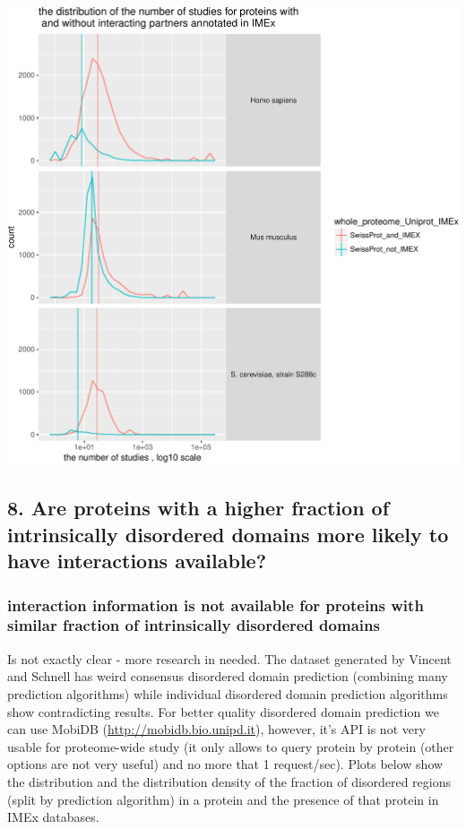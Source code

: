 \documentclass[]{article}
\begin{document}
\includegraphics{final_report_files/figure-latex/presence_in_IMEx_vs_publications-1.pdf}

\subsection{8. Are proteins with a higher fraction of intrinsically
disordered domains more likely to have interactions
available?}\label{are-proteins-with-a-higher-fraction-of-intrinsically-disordered-domains-more-likely-to-have-interactions-available}

\subsubsection{interaction information is not available for proteins
with similar fraction of intrinsically disordered
domains}\label{interaction-information-is-not-available-for-proteins-with-similar-fraction-of-intrinsically-disordered-domains}

Is not exactly clear - more research in needed. The dataset generated by
Vincent and Schnell has weird consensus disordered domain prediction
(combining many prediction algorithms) while individual disordered
domain prediction algorithms show contradicting results. For better
quality disordered domain prediction we can use MobiDB
(\url{http://mobidb.bio.unipd.it}), however, it's API is not very usable
for proteome-wide study (it only allows to query protein by protein
(other options are not very useful) and no more that 1 request/sec).
Plots below show the distribution and the distribution density of the
fraction of disordered regions (split by prediction algorithm) in a
protein and the presence of that protein in IMEx databases.
\end{document}
